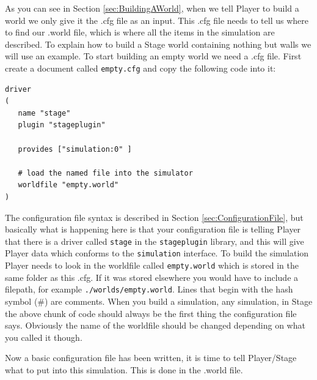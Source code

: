 \documentclass[a4paper]{report}
\newcommand{\plst}{Player/Stage\xspace}
\newcommand{\pl}{Player\xspace}
\begin{document}
As you can see in Section \ref{sec:BuildingAWorld}, when we tell \pl to build a world we only give it the .cfg file as an input. This .cfg file needs to tell us where to find our .world file, which is where all the items in the simulation are described. To explain how to build a Stage world containing nothing but walls we will use an example.\newline
To start building an empty world we need a .cfg file. First create a document called \verb|empty.cfg| and copy the following code into it:
\begin{verbatim}
driver
(		
   name "stage"
   plugin "stageplugin"

   provides ["simulation:0" ]

   # load the named file into the simulator
   worldfile "empty.world"	
)
\end{verbatim}
The configuration file syntax is described in Section \ref{sec:ConfigurationFile}, but basically what is happening here is that your configuration file is telling \pl that there is a driver called \verb|stage| in the \verb|stageplugin| library, and this will give \pl data which conforms to the \verb|simulation| interface. 
To build the simulation \pl needs to look in the worldfile called \verb|empty.world| which is stored in the same folder as this .cfg. 
If it was stored elsewhere you would have to include a filepath, for example \verb|./worlds/empty.world|. Lines that begin with the hash symbol (\#) are comments.
When you build a simulation, any simulation, in Stage the above chunk of code should always be the first thing the configuration file says. Obviously the name of the worldfile should be changed depending on what you called it though.

Now a basic configuration file has been written, it is time to tell \plst what to put into this simulation. This is done in the .world file. 
\end{document}
